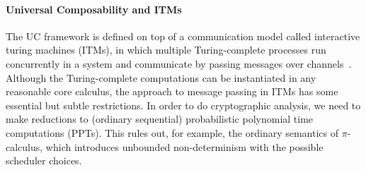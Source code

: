 

\paragraph{Universal Composability and ITMs}
The UC framework is defined on top of a communication model called interactive turing machines (ITMs), in which multiple Turing-complete processes run concurrently in a system and communicate by passing messages over channels~\cite{canettiUC}.
Although the Turing-complete computations can be instantiated in any reasonable core calculus, the approach to message passing in ITMs has some essential but subtle restrictions.
In order to do cryptographic analysis, we need to make reductions to (ordinary sequential) probabilistic polynomial time computations (PPTs).
This rules out, for example, the ordinary semantics of $\pi$-calculus, which introduces unbounded non-determinism with the possible scheduler choices.


